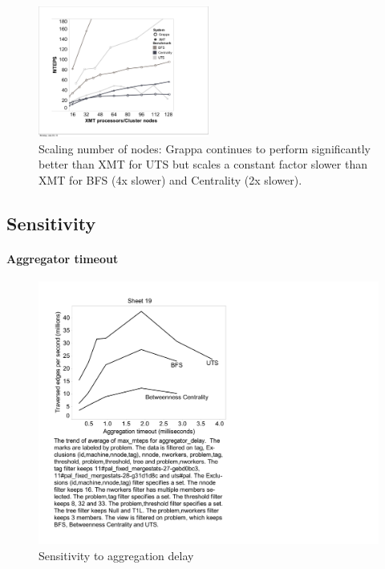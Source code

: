\begin{figure}[ht]
    \begin{center}
      \includegraphics[width=0.5\textwidth]{figs/scaling_cropped.pdf}
    \end{center}
    \caption{Scaling number of nodes: Grappa continues to perform significantly better than XMT for UTS but scales a constant factor slower than XMT for BFS (4x slower) and Centrality (2x slower). }
    \label{fig:uts_threshold}
\end{figure}


\subsection{Sensitivity}

\paragraph{Aggregator timeout}

\begin{figure}[htb]
\begin{center}
  \includegraphics[width=0.95\columnwidth]{figs/flushticks_sweep}
\begin{minipage}{0.95\columnwidth}
  \caption{\label{fig:bfs-sweep-flushticks} Sensitivity to aggregation delay}
\end{minipage}
\vspace{-3ex}
\end{center}
\end{figure}



